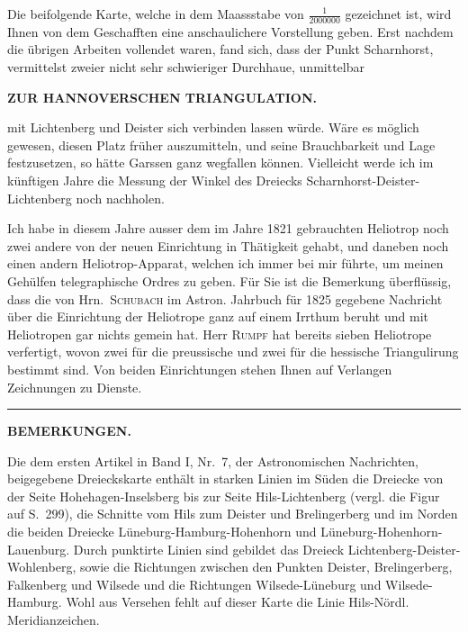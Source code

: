\par\noindent\hspace*{\parindent}Die beifolgende Karte, welche in dem Maassstabe von \(\frac{1}{2000000}\) gezeichnet ist, wird Ihnen von dem Geschafften eine anschaulichere Vorstellung geben. Erst nachdem die übrigen Arbeiten vollendet waren, fand sich, dass der Punkt Scharnhorst, vermittelst zweier nicht sehr schwieriger Durchhaue, unmittelbar

\par\clearpage
\noindent{}\hfill{\small\textbf{ZUR HANNOVERSCHEN TRIANGULATION.}}\hfill\null\par\medskip
\noindent mit Lichtenberg und Deister sich verbinden lassen würde. Wäre es möglich gewesen, diesen Platz früher auszumitteln, und seine Brauchbarkeit und Lage festzusetzen, so hätte Garssen ganz wegfallen können. Vielleicht werde ich im künftigen Jahre die Messung der Winkel des Dreiecks Scharnhorst-Deister-Lichtenberg noch nachholen.
\par\noindent\hspace*{\parindent}Ich habe in diesem Jahre ausser dem im Jahre 1821 gebrauchten Heliotrop noch zwei andere von der neuen Einrichtung in Thätigkeit gehabt, und daneben noch einen andern Heliotrop-Apparat, welchen ich immer bei mir führte, um meinen Gehülfen telegraphische Ordres zu geben. Für Sie ist die Bemerkung überflüssig, dass die von Hrn.~\textsc{Schubach} im Astron. Jahrbuch für 1825 gegebene Nachricht über die Einrichtung der Heliotrope ganz auf einem Irrthum beruht und mit  Heliotropen gar nichts gemein hat. Herr \textsc{Rumpf} hat bereits sieben Heliotrope verfertigt, wovon zwei für die preussische und zwei für die hessische Triangulirung bestimmt sind. Von beiden Einrichtungen stehen Ihnen auf Verlangen Zeichnungen zu Dienste.
\begin{center}\rule{.12\linewidth}{.4pt}\end{center}
\begin{center}\textbf{BEMERKUNGEN.}\end{center}
\begingroup\small
\par\noindent\hspace*{\parindent}Die dem ersten Artikel in Band I, Nr.~7, der Astronomischen Nachrichten, beigegebene Dreieckskarte enthält in starken Linien im Süden die Dreiecke von der Seite Hohehagen-Inselsberg bis zur Seite Hils-Lichtenberg (vergl. die Figur auf S.~299), die Schnitte vom Hils zum Deister und Brelingerberg und im Norden die beiden Dreiecke Lüneburg-Hamburg-Hohenhorn und Lüneburg-Hohenhorn-Lauenburg. Durch punktirte Linien sind gebildet das Dreieck Lichtenberg-Deister-Wohlenberg, sowie die Richtungen zwischen den Punkten Deister, Brelingerberg, Falkenberg und Wilsede und die Richtungen Wilsede-Lüneburg und Wilsede-Hamburg. Wohl aus Versehen fehlt auf dieser Karte die Linie Hils-Nördl. Meridianzeichen.
